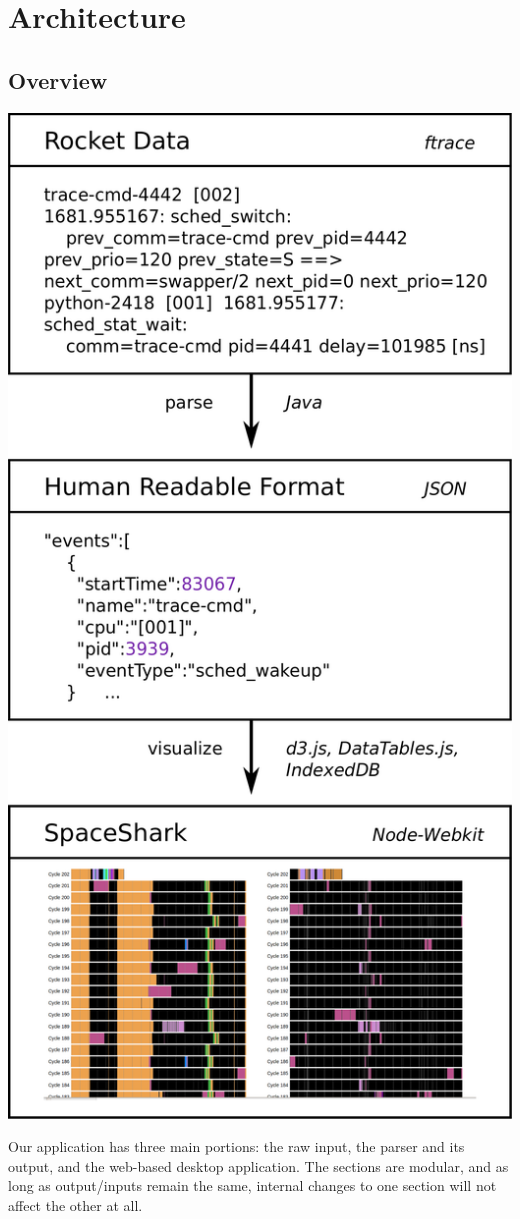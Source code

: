 \documentclass{hmcclinic}
\begin{document}
\section{Architecture} %

  \subsection{Overview}
\begin{center}
  \includegraphics[scale=0.18]{architecture_diagram.png}
\end{center}
  Our application has three main portions: the raw input, the parser and its
  output, and the web-based desktop application. The sections are modular, and
  as long as output/inputs remain the same, internal changes to one section will
  not affect the other at all.
\end{document}
